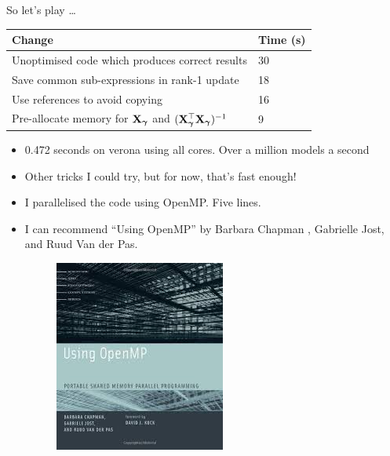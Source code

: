 \documentclass{beamer}
\begin{document}
\begin{frame}{So let's play \ldots}
\begin{tabular}{|p{9cm}l|}
\hline
Change & Time (s) \\
\hline
Unoptimised code which produces correct results & 30 \\
Save common sub-expressions in rank-1 update & 18 \\
Use references to avoid copying & 16 \\
Pre-allocate memory for ${\bf X}_{\boldsymbol \gamma}$ and $({\bf X}_{\boldsymbol \gamma}^\top {\bf X}_{\boldsymbol \gamma})^{-1}$ & 9 \\
\hline
\end{tabular}
\begin{itemize}
\item 0.472 seconds on verona using all cores. Over a million models a second
\item Other tricks I could try, but for now, that's fast enough!
\item I parallelised the code using OpenMP. Five lines.
\item I can recommend ``Using OpenMP'' by Barbara Chapman , Gabrielle Jost, and Ruud Van der Pas.
\begin{figure}
\includegraphics[scale=0.3]{Using_OpenMP.jpeg}
\end{figure}
\end{itemize}
\end{frame}
\end{document}

